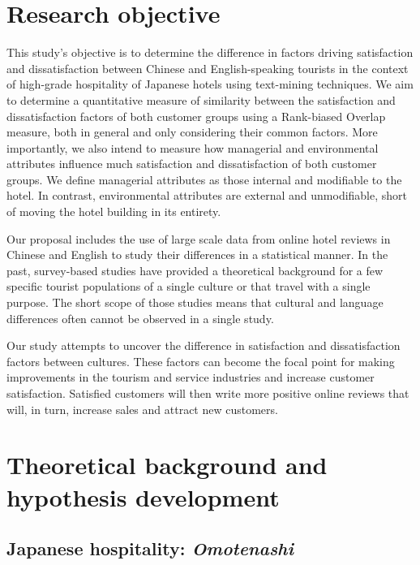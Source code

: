 \documentclass[smallextended,natbib]{svjour3}       %
\begin{document}
\section{Research objective}\label{research_objective}

  This study's objective is to determine the difference in factors driving satisfaction and dissatisfaction between Chinese and English-speaking tourists in the context of high-grade hospitality of Japanese hotels using text-mining techniques. We aim to determine a quantitative measure of similarity between the satisfaction and dissatisfaction factors of both customer groups using a Rank-biased Overlap measure, both in general and only considering their common factors. More importantly, we also intend to measure how managerial and environmental attributes influence much satisfaction and dissatisfaction of both customer groups. We define managerial attributes as those internal and modifiable to the hotel. In contrast, environmental attributes are external and unmodifiable, short of moving the hotel building in its entirety.

  Our proposal includes the use of large scale data from online hotel reviews in Chinese and English to study their differences in a statistical manner. In the past, survey-based studies have provided a theoretical background for a few specific tourist populations of a single culture or that travel with a single purpose. The short scope of those studies means that cultural and language differences often cannot be observed in a single study. 

  Our study attempts to uncover the difference in satisfaction and dissatisfaction factors between cultures. These factors can become the focal point for making improvements in the tourism and service industries and increase customer satisfaction. Satisfied customers will then write more positive online reviews that will, in turn, increase sales and attract new customers. 

\section{Theoretical background and hypothesis development}\label{theory_hypothesis}

  \subsection{Japanese hospitality: \textit{Omotenashi}}\label{theory_omotenashi}
\end{document}
